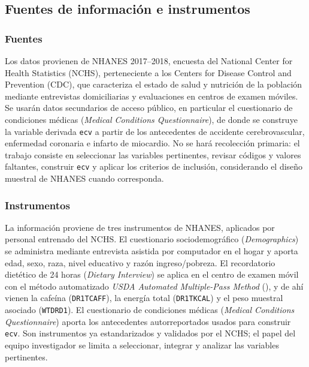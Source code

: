 \documentclass[
  spanish,
  12pt,
]{article}
\begin{document}
\subsection{Fuentes de información e instrumentos}\label{fuentes-de-informaciuxf3n-e-instrumentos}

\subsubsection{Fuentes}\label{fuentes}

Los datos provienen de NHANES 2017--2018, encuesta del National Center
for Health Statistics (NCHS), perteneciente a los Centers for Disease
Control and Prevention (CDC), que caracteriza el estado de salud y
nutrición de la población mediante entrevistas domiciliarias y
evaluaciones en centros de examen móviles. Se usarán datos secundarios
de acceso público, en particular el cuestionario de condiciones
médicas (\emph{Medical Conditions Questionnaire}), de donde se construye la
variable derivada \texttt{ecv} a partir de los antecedentes de accidente
cerebrovascular, enfermedad coronaria e infarto de miocardio. No se
hará recolección primaria: el trabajo consiste en seleccionar las
variables pertinentes, revisar códigos y valores faltantes, construir
\texttt{ecv} y aplicar los criterios de inclusión, considerando el diseño
muestral de NHANES cuando corresponda.

\subsubsection{Instrumentos}\label{instrumentos}

La información proviene de tres instrumentos de NHANES, aplicados por
personal entrenado del NCHS. El cuestionario sociodemográfico
(\emph{Demographics}) se administra mediante entrevista asistida por
computador en el hogar y aporta edad, sexo, raza, nivel educativo y
razón ingreso/pobreza. El recordatorio dietético de 24 horas (\emph{Dietary
Interview}) se aplica en el centro de examen móvil con el método
automatizado \emph{USDA Automated Multiple-Pass Method} (),
y de ahí vienen la cafeína (\texttt{DR1TCAFF}), la energía total (\texttt{DR1TKCAL})
y el peso muestral asociado (\texttt{WTDRD1}). El cuestionario de condiciones
médicas (\emph{Medical Conditions Questionnaire}) aporta los antecedentes
autorreportados usados para construir \texttt{ecv}. Son instrumentos ya
estandarizados y validados por el NCHS; el papel del equipo
investigador se limita a seleccionar, integrar y analizar las
variables pertinentes.
\end{document}
